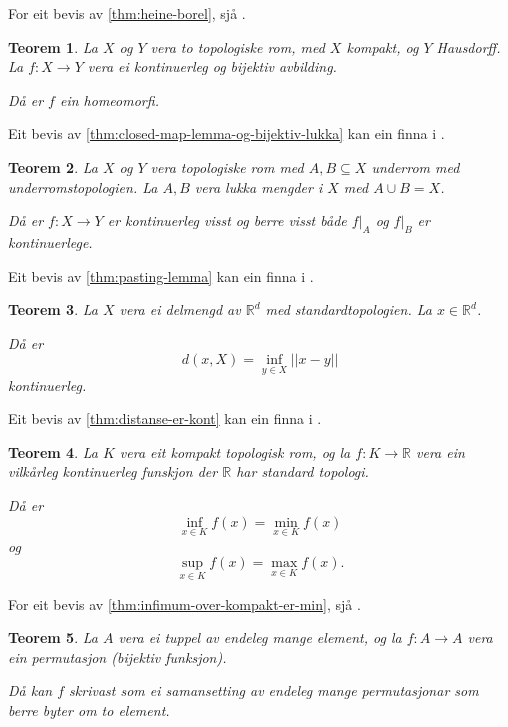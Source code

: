 \documentclass[a4paper, 12pt, norsk]{article}
\theoremstyle{plain}
\newtheorem{theorem}{Teorem}[section]
\theoremstyle{definition}
\newcommand{\Rb}{\mathbb{R}}
\newcommand{\union}{ \mathop{\cup}\limits }
\begin{document}
For eit bevis av \autoref{thm:heine-borel}, sjå \cite[s. 100]{MR3932132}.

\begin{theorem} \label{thm:closed-map-lemma-og-bijektiv-lukka}
	La \( X \) og \( Y \) vera to topologiske rom, med \( X \) kompakt, og \( Y \) Hausdorff. La \( f: X \to Y \) vera ei kontinuerleg og bijektiv avbilding.

	Då er \( f \) ein homeomorfi.
\end{theorem}

Eit bevis av \autoref{thm:closed-map-lemma-og-bijektiv-lukka} kan ein finna i \cite[s. 135--136]{MR2548039}.

\begin{theorem} \label{thm:pasting-lemma}
	La \( X \) og \( Y \) vera topologiske rom med \( A, B \subseteq X \) underrom med underromstopologien. La \( A, B \) vera lukka mengder i \( X \) med \( A \union B = X \). 
	
	Då er \( f: X \to Y \) er kontinuerleg visst og berre visst både \( f|_A \) og \( f|_B \) er kontinuerlege.
\end{theorem}

Eit bevis av \autoref{thm:pasting-lemma} kan ein finna i \cite[s. 108--109]{MR3728284}.

\begin{theorem} \label{thm:distanse-er-kont}
	La \( X \) vera ei delmengd av \( \Rb^d \) med standardtopologien. La \( x \in \Rb^d \). 
	
	Då er
	\[
		d(x, X) = \inf_{y \in X} ||x-y||
	\]
	kontinuerleg.
\end{theorem}

Eit bevis av \autoref{thm:distanse-er-kont} kan ein finna i \cite[s. 90--91]{MR3838450}.

\begin{theorem} \label{thm:infimum-over-kompakt-er-min} \label{thm:supremum-over-kompakt-er-maks}
	La \( K \) vera eit kompakt topologisk rom, og la \( f: K \to \Rb \) vera ein vilkårleg kontinuerleg funskjon der \( \Rb \) har standard topologi. 
	
	Då er
	\[
		\inf_{x \in K} f(x) = \min_{x \in K} f(x)
	\]
	og
	\[
		\sup_{x \in K} f(x) = \max_{x \in K} f(x).
	\]
\end{theorem}

For eit bevis av \autoref{thm:infimum-over-kompakt-er-min}, sjå \cite[s. 132]{MR2548039}.

\begin{theorem} \label{thm:permutasjon}
	La \( A \) vera ei tuppel av endeleg mange element, og la \( f: A \to A \) vera ein permutasjon (bijektiv funksjon).
	
	Då kan \( f \) skrivast som ei samansetting av endeleg mange permutasjonar som berre byter om to element.
\end{theorem}
\end{document}
